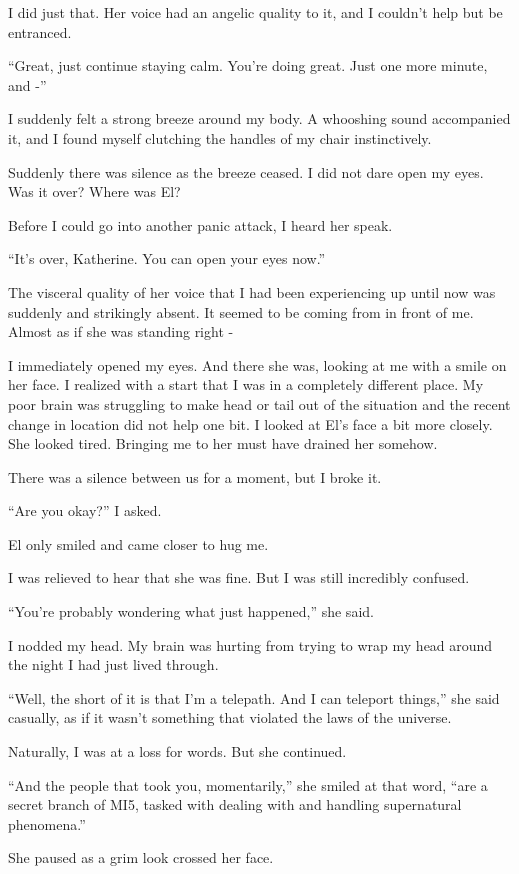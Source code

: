 I did just that. Her voice had an angelic quality to it, and I couldn’t help but be entranced. 

“Great, just continue staying calm. You’re doing great. Just one more minute, and -”

I suddenly felt a strong breeze around my body. A whooshing sound accompanied it, and I found myself clutching the handles of my chair instinctively.

Suddenly there was silence as the breeze ceased. I did not dare open my eyes. Was it over? Where was El?

Before I could go into another panic attack, I heard her speak.

“It’s over, Katherine. You can open your eyes now.”

The visceral quality of her voice that I had been experiencing up until now was suddenly and strikingly absent. It seemed to be coming from in front of me. Almost as if she was standing right -

I immediately opened my eyes. And there she was, looking at me with a smile on her face. I realized with a start that I was in a completely different place. My poor brain was struggling to make head or tail out of the situation and the recent change in location did not help one bit. I looked at El’s face a bit more closely. She looked tired. Bringing me to her must have drained her somehow.

There was a silence between us for a moment, but I broke it. 

“Are you okay?” I asked.

El only smiled and came closer to hug me.

I was relieved to hear that she was fine. But I was still incredibly confused.

“You’re probably wondering what just happened,” she said.

I nodded my head. My brain was hurting from trying to wrap my head around the night I had just lived through.

“Well, the short of it is that I’m a telepath. And I can teleport things,” she said casually, as if it wasn’t something that violated the laws of the universe.

Naturally, I was at a loss for words. But she continued.

“And the people that took you, momentarily,” she smiled at that word, “are a secret branch of MI5, tasked with dealing with and handling supernatural phenomena.”

She paused as a grim look crossed her face.

